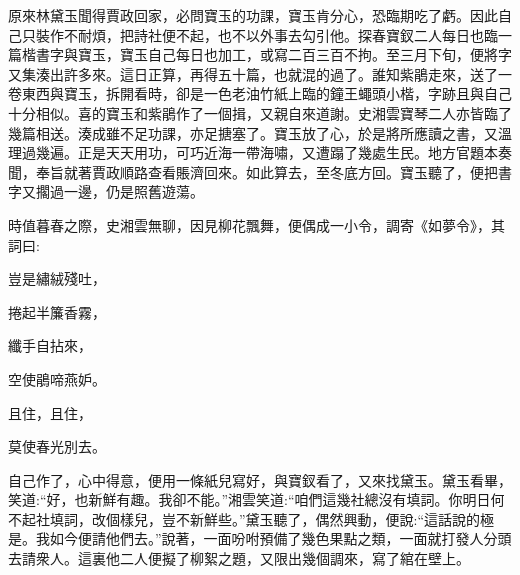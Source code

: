 \begin{parag}
    原來林黛玉聞得賈政回家，必問寶玉的功課，寶玉肯分心，恐臨期吃了虧。因此自己只裝作不耐煩，把詩社便不起，也不以外事去勾引他。探春寶釵二人每日也臨一篇楷書字與寶玉，寶玉自己每日也加工，或寫二百三百不拘。至三月下旬，便將字又集湊出許多來。這日正算，再得五十篇，也就混的過了。誰知紫鵑走來，送了一卷東西與寶玉，拆開看時，卻是一色老油竹紙上臨的鐘王蠅頭小楷，字跡且與自己十分相似。喜的寶玉和紫鵑作了一個揖，又親自來道謝。史湘雲寶琴二人亦皆臨了幾篇相送。湊成雖不足功課，亦足搪塞了。寶玉放了心，於是將所應讀之書，又溫理過幾遍。正是天天用功，可巧近海一帶海嘯，又遭蹋了幾處生民。地方官題本奏聞，奉旨就著賈政順路查看賬濟回來。如此算去，至冬底方回。寶玉聽了，便把書字又擱過一邊，仍是照舊遊蕩。
\end{parag}


\begin{parag}
    時值暮春之際，史湘雲無聊，因見柳花飄舞，便偶成一小令，調寄《如夢令》，其詞曰:
\end{parag}


\begin{poem}
    \begin{pl}豈是繡絨殘吐，\end{pl}

    \begin{pl}捲起半簾香霧，\end{pl}

    \begin{pl}纖手自拈來，\end{pl}

    \begin{pl}空使鵑啼燕妒。\end{pl}

    \begin{pl}且住，且住，\end{pl}

    \begin{pl}莫使春光別去。\end{pl}


\end{poem}


\begin{parag}
    自己作了，心中得意，便用一條紙兒寫好，與寶釵看了，又來找黛玉。黛玉看畢，笑道:“好，也新鮮有趣。我卻不能。”湘雲笑道:“咱們這幾社總沒有填詞。你明日何不起社填詞，改個樣兒，豈不新鮮些。”黛玉聽了，偶然興動，便說:“這話說的極是。我如今便請他們去。”說著，一面吩咐預備了幾色果點之類，一面就打發人分頭去請衆人。這裏他二人便擬了柳絮之題，又限出幾個調來，寫了綰在壁上。
\end{parag}



